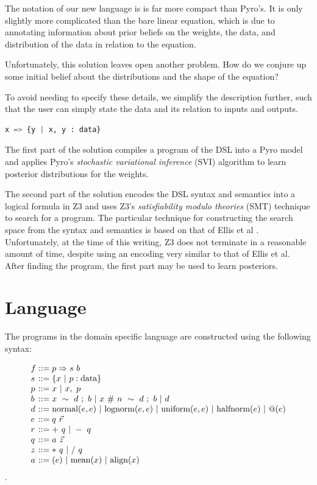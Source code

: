 \documentclass[letterpaper]{llncs}
\begin{document}
The notation of our new language is is far more compact than Pyro's. 
It is only slightly more complicated than the bare linear equation, which is
due to annotating information about prior beliefs on the weights, the data, and 
distribution of the data in relation to the equation. 

Unfortunately, this solution leaves open another problem. How do we conjure up some 
initial belief about the distributions and the shape of the equation? 

To avoid needing to specify these details, we simplify the description further, such that the 
user can simply state the data and its relation to inputs and outputs. 

\begin{lstlisting}[language=Python]
x => {y | x, y : data}
\end{lstlisting}

The first part of the solution compiles a program of the DSL into a Pyro model and applies Pyro's 
\textit{stochastic variational inference} (SVI) algorithm \cite{svi} to learn posterior distributions for the weights. 

The second part of the solution encodes the DSL syntax and semantics into
a logical formula in Z3 \cite{z3} and uses Z3's \textit{satisfiability modulo theories} (SMT) technique \cite{smt} to search
for a program.  
The particular technique for constructing the search space from the syntax and semantics 
is based on that of Ellis et al \cite{ellis}.
Unfortunately, at the time of this writing, Z3 does not terminate in a reasonable amount of time, 
despite using an encoding very similar to that of Ellis et al. 
After finding the program, the first part may be used to learn posteriors. 

\section{Language}

The programs in the domain specific language are constructed using the following syntax:

\[
  \begin{array}{l @{} l}
    f &{} ::= p \Rightarrow s\ b \\
    s &{} ::= \{ x \ |\ p : \text{data} \} \\
    p &{} ::= x  \ |\ x,\ p \\
    b &{} ::= x\ \sim\ d\ ;\ b \ |\ x\ \#\ n\ \sim\ d\ ;\ b \ |\ d \\ 
    d &{} ::= 
        \text{normal}(e, e) \ |\ 
        \text{lognorm}(e, e) \ |\ 
        \text{uniform}(e, e) \ |\ 
        \text{halfnorm}(e) \ |\ 
        @(e) \\ 
    e &{} ::= q\ \vec{r} \\
    r &{} ::= +\ q \ |\ -\ q \\
    q &{} ::= a\ \vec{z} \\
    z &{} ::= *\ q \ |\ /\ q \\
    a &{} ::= (e) \ |\ \text{mean}(x) \ |\ \text{align}(x)\\
  \end{array}
\]
.
\end{document}
